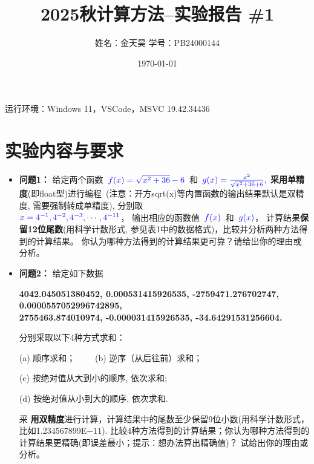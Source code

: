 \documentclass[UTF8]{ctexart}
\title{\bf 2025秋计算方法--实验报告 \#1}
\author{姓名：金天昊 \quad 学号：PB24000144}
\date{\today}
\begin{document}
\maketitle
运行环境：Windows 11，VSCode，MSVC 19.42.34436

\section*{实验内容与要求}
\begin{itemize}
  \item{\bf 问题1：}
  给定两个函数~$\color{blue}f(x)=\sqrt{x^2+36}-6$~和~$\color{blue}g(x)=\frac{x^2}{\sqrt{x^2+36} + 6},$
{\bf\color{red} 采用单精度}(即float型)进行编程~(注意：开方sqrt(x)等内置函数的输出结果默认是双精度,
需要强制转成单精度), 分别取\\
$\color{blue}x=4^{-1}, 4^{-2}, 4^{-3}, \cdots, 4^{-11}$，
输出相应的函数值~$\color{blue}f(x)$~和~$\color{blue}g(x)$，
计算结果{\bf 保留12位尾数}(用科学计数形式, 参见表1中的数据格式)，比较并分析两种方法得到的计算结果。
你认为哪种方法得到的计算结果更可靠？请给出你的理由或分析。

  \item{\bf 问题2：} 给定如下数据


{\bf
4042.045051380452,  0.000531415926535, -2759471.276702747, 0.0000557052996742895, \\
2755463.874010974, -0.000031415926535, -34.64291531256604.}

分别采取以下4种方式求和：

(a) 顺序求和； ~~~~(b) 逆序（从后往前）求和；

(c) 按绝对值从大到小的顺序, 依次求和;

(d) 按绝对值从小到大的顺序, 依次求和.

采{\bf\color{red} 用双精度}进行计算，计算结果中的尾数至少保留9位小数(用科学计数形式，比如1.234567899E$-11$).
比较4种方法得到的计算结果；你认为哪种方法得到的计算结果更精确(即误差最小；提示：想办法算出精确值)？
试给出你的理由或分析。



\end{itemize}
\end{document}
